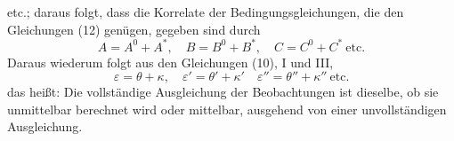 etc.; daraus folgt, dass die Korrelate der Bedingungsgleichungen, die den Gleichungen (12) genügen, gegeben sind durch
\[
A=A^0+A^*,\quad B=B^0+B^*,\quad C=C^0+C^*\ \text{etc.}
\]
Daraus wiederum folgt aus den Gleichungen (10), I und III,
\[
\varepsilon=\theta+\kappa,\quad\varepsilon'=\theta'+\kappa'\quad\varepsilon''=\theta''+\kappa''\ \text{etc.}
\]
das heißt: Die vollständige Ausgleichung der Beobachtungen ist dieselbe, ob sie unmittelbar berechnet wird oder mittelbar, ausgehend von einer unvollständigen Ausgleichung.
